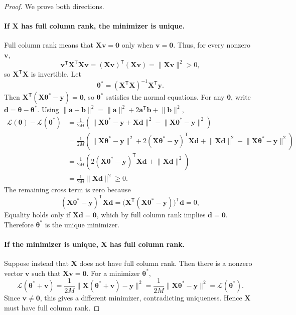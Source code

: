 \documentclass[11pt]{article}
\newcommand{\transpose}{^{\mathsf T}}
\newcommand{\loss}{\mathcal{L}}
\begin{document}
\begin{proof}
We prove both directions.

\paragraph{If $\bm{X}$ has full column rank, the minimizer is unique.}
Full column rank means that $\bm{X}\bm{v}=\bm{0}$ only when $\bm{v}=\bm{0}$. Thus, for every nonzero $\bm{v}$,
\[
 \bm{v}\transpose\bm{X}\transpose\bm{X}\bm{v}
=(\bm{X}\bm{v})\transpose(\bm{X}\bm{v})
=\lVert\bm{X}\bm{v}\rVert^2>0,
\]
so $\bm{X}\transpose\bm{X}$ is invertible. Let
\[
\bm{\theta}^{*}=(\bm{X}\transpose\bm{X})^{-1}\bm{X}\transpose\bm{y}.
\]
Then $\bm{X}\transpose(\bm{X}\bm{\theta}^{*}-\bm{y})=\bm{0}$, so $\bm{\theta}^{*}$ satisfies the normal equations. For any $\bm{\theta}$, write $\bm{d}=\bm{\theta}-\bm{\theta}^{*}$. Using $\lVert\bm{a}+\bm{b}\rVert^2=\lVert\bm{a}\rVert^2+2\bm{a}\transpose\bm{b}+\lVert\bm{b}\rVert^2$,
\begin{align*}
\loss(\bm{\theta})-\loss(\bm{\theta}^{*})
&=\frac{1}{2M}\left(
 \lVert\bm{X}\bm{\theta}^{*}-\bm{y}+\bm{X}\bm{d}\rVert^2
 -\lVert\bm{X}\bm{\theta}^{*}-\bm{y}\rVert^2\right)\\
&=\frac{1}{2M}\left(
 \lVert\bm{X}\bm{\theta}^{*}-\bm{y}\rVert^2
 +2(\bm{X}\bm{\theta}^{*}-\bm{y})\transpose\bm{X}\bm{d}
 +\lVert\bm{X}\bm{d}\rVert^2
 -\lVert\bm{X}\bm{\theta}^{*}-\bm{y}\rVert^2\right)\\
&=\frac{1}{2M}\left(
 2(\bm{X}\bm{\theta}^{*}-\bm{y})\transpose\bm{X}\bm{d}
 +\lVert\bm{X}\bm{d}\rVert^2
\right)\\
&=\frac{1}{2M}\lVert\bm{X}\bm{d}\rVert^2\geq 0.
\end{align*}
The remaining cross term is zero because
\[
(\bm{X}\bm{\theta}^{*}-\bm{y})\transpose\bm{X}\bm{d}
=\bigl(\bm{X}\transpose(\bm{X}\bm{\theta}^{*}-\bm{y})\bigr)\transpose\bm{d}=0,
\]
Equality holds only if $\bm{X}\bm{d}=\bm{0}$, which by full column rank implies $\bm{d}=\bm{0}$. Therefore $\bm{\theta}^{*}$ is the unique minimizer.

\paragraph{If the minimizer is unique, $\bm{X}$ has full column rank.}
Suppose instead that $\bm{X}$ does not have full column rank. Then there is a nonzero vector $\bm{v}$ such that $\bm{X}\bm{v}=\bm{0}$. For a minimizer $\bm{\theta}^{*}$,
\[
 \loss(\bm{\theta}^{*}+\bm{v})
=\frac{1}{2M}\lVert\bm{X}(\bm{\theta}^{*}+\bm{v})-\bm{y}\rVert^2
=\frac{1}{2M}\lVert\bm{X}\bm{\theta}^{*}-\bm{y}\rVert^2
=\loss(\bm{\theta}^{*}).
\]
Since $\bm{v}\neq\bm{0}$, this gives a different minimizer, contradicting uniqueness. Hence $\bm{X}$ must have full column rank.
\end{proof}
\end{document}
